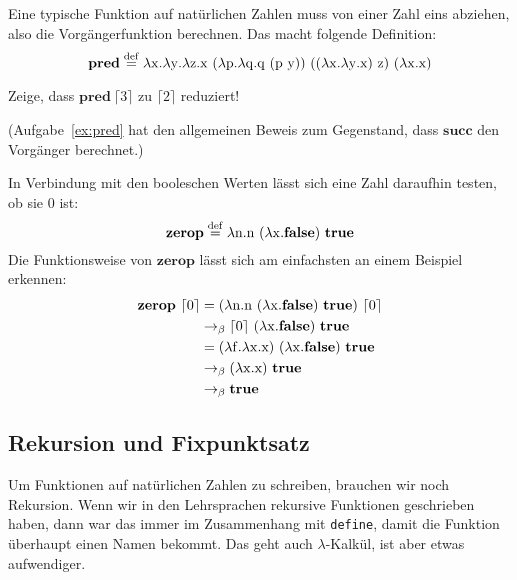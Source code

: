 %
Eine typische Funktion auf natürlichen Zahlen muss von einer Zahl eins
abziehen, also die Vorgängerfunktion berechnen.  Das macht folgende
Definition:
%
\begin{displaymath}
  \mathbf{pred} \stackrel{\rm def}{=}{} \lambda \mathrm x.\lambda \mathrm y.\lambda \mathrm z.\mathrm x~(\lambda \mathrm p.\lambda
  \mathrm q.\mathrm q~(\mathrm p~\mathrm y))~((\lambda \mathrm x.\lambda \mathrm y.\mathrm x)~\mathrm z)~(\lambda \mathrm x.\mathrm x)
\end{displaymath}
%
\begin{aufgabe}
  Zeige, dass $\mathbf{pred}~\lceil 3\rceil$ zu $\lceil 2\rceil$ reduziert!
\end{aufgabe}
%
(Aufgabe~\ref{ex:pred} hat den allgemeinen Beweis zum Gegenstand,
dass $\mathbf{succ}$ den Vorgänger berechnet.)

In Verbindung mit den booleschen Werten lässt sich eine Zahl daraufhin
testen, ob sie $0$ ist:
%
\begin{displaymath}
  \mathbf{zerop} \stackrel{\rm def}{=}{} \lambda \mathrm n.\mathrm n~(\lambda \mathrm x.\mathbf{false})~\mathbf{true}
\end{displaymath}
%
Die Funktionsweise von $\mathbf{zerop}$ lässt sich am einfachsten an
einem Beispiel erkennen:
%
\begin{displaymath}
  \begin{split}
    \mathbf{zerop}~\lceil 0\rceil & =
    (\lambda \mathrm n.\mathrm n~(\lambda \mathrm x.\mathbf{false})~\mathbf{true})~\lceil 0\rceil\\
    & \rightarrow_\beta \lceil 0\rceil~(\lambda \mathrm x.\mathbf{false})~\mathbf{true}\\
    & = (\lambda \mathrm f.\lambda \mathrm x.\mathrm x)~(\lambda \mathrm x.\mathbf{false})~\mathbf{true}\\
    & \rightarrow_\beta (\lambda \mathrm x.\mathrm x)~\mathbf{true}\\
    & \rightarrow_\beta \mathbf{true}
  \end{split}
\end{displaymath}
%

\subsection{Rekursion und Fixpunktsatz}
\label{sec:fixpunktsatz}
%
Um Funktionen auf natürlichen Zahlen zu schreiben, brauchen wir noch
Rekursion.  Wenn wir in den Lehrsprachen rekursive Funktionen
geschrieben haben, dann war das immer im Zusammenhang mit
\lstinline{define}, damit die Funktion überhaupt einen Namen bekommt.
Das geht auch $\lambda$-Kalkül, ist aber etwas aufwendiger.

